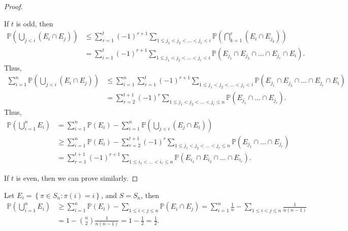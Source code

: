 \begin{proof}
\begin{itemize}
        If \(t\) is odd, then 
        \begin{align*}
            \mathbb{P} \left( \bigcup_{j < i} (E_i \cap E_j)  \right) &\le \sum_{r=1}^t (-1)^{r+1} \sum_{1 \le j_1 < j_2 < \dots < j_r < i} \mathbb{P} \left( \bigcap_{k=1}^{r} (E_{i} \cap E_{j_{k} })  \right) \\
            &= \sum_{i=1}^t (-1)^{r + 1} \sum_{1 \le j_1 < j_2 < \dots < j_r < i}\mathbb{P} (E_{j_1} \cap E_{j_2} \cap \dots \cap E_{j_r} \cap E_i).     
        \end{align*} 
        Thus, 
        \begin{align*}
            \sum_{i=1}^n \mathbb{P} \left( \bigcup_{j < i} (E_i \cap E_j)  \right) &\le \sum_{i=1}^n \sum_{r=1}^t (-1)^{r + 1} \sum_{1 \le j_1 < j_2 < \dots < j_r < i} \mathbb{P} \left( E_{j_1} \cap E_{j_2} \cap \dots \cap E_{j_r} \cap E_i \right) \\
            &= \sum_{r=2}^{t + 1} (-1)^r \sum_{1 \le j_1 < j_2 < \dots < j_r \le n} \mathbb{P} (E_{j_1} \cap \dots \cap E_{j_r}).        
        \end{align*}  
        Thus, 
        \begin{align*}
            \mathbb{P} \left( \bigcup_{i=1}^{n} E_i  \right) &= \sum_{i=1}^n \mathbb{P} (E_i) - \sum_{i=1}^n \mathbb{P} \left( \bigcup_{j < i} (E_j \cap E_i)  \right) \\
            &\ge \sum_{i=1}^n \mathbb{P} (E_i) - \sum_{r=2}^{t + 1} (-1)^r \sum_{1 \le j_1 < j_2 < \dots < j_r \le n} \mathbb{P} (E_{j_1} \cap \dots \cap E_{j_r}) \\
            &= \sum_{r=1}^{t+1} (-1)^{r + 1} \sum_{1 \le i_1 < \dots < i_r \le n} \mathbb{P} (E_{i_1} \cap E_{i_2} \cap \dots \cap E_{i_r}).         
        \end{align*}
    \end{itemize} 

    If \(t\) is even, then we can prove similarly. 
\end{proof}

\begin{eg}
    Let \(E_i = \left\{ \pi \in S_n : \pi (i) = i \right\} \), and \(S = S_n\), then 
    \begin{align*}
        \mathbb{P} \left( \bigcup_{i=1}^{n} E_i  \right) &\ge \sum_{i=1}^n \mathbb{P} (E_i) - \sum_{1 \le i < j \le n} \mathbb{P} (E_i \cap E_j) = \sum_{i=1}^n \frac{1}{n} - \sum_{1 \le i < j \le n}\frac{1}{n(n-1)} \\
        &= 1 - \binom{n}{2} \frac{1}{n(n-1)} = 1 - \frac{1}{2} = \frac{1}{2}.     
    \end{align*} 
\end{eg}

